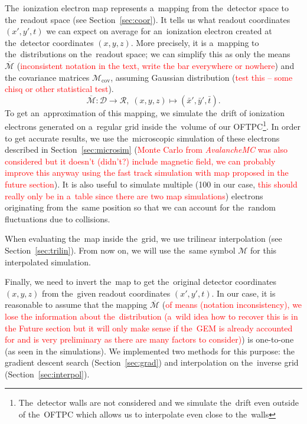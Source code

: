 		The~ionization electron map represents a~mapping from the~detector space to the~readout space (see Section~\ref{sec:coor}). It tells us what readout coordinates $(x',y',t)$ we can expect on average for an~ionization electron created at the~detector coordinates $(x,y,z)$. More precisely, it is a~mapping to the~distributions on the~readout space; we can simplify this as only the means $\overbar{\mathcal{M}}$ (\textcolor{red}{inconsistent notation in the text, write the bar everywhere or nowhere}) and the covariance matrices $\mathcal{M}_\text{cov}$, assuming Gaussian distribution (\textcolor{red}{test this -- some chisq or other statistical test}).
			\begin{equation}
				\overbar{\mathcal{M}}: \mathcal{D} \longrightarrow \mathcal{R},\; (x,y,z) \longmapsto (\bar{x}',\bar{y}',\bar{t}).
			\end{equation}
		To get an~approximation of this mapping, we simulate the~drift of ionization electrons generated on a~regular grid inside the~volume of our \ac{OFTPC}\footnote{The~detector walls are not considered and we simulate the~drift even outside of the~\ac{OFTPC} which allows us to interpolate even close to the~walls}. In order to get accurate results, we use the~microscopic simulation of these electrons described in Section~\ref{sec:microsim} (\textcolor{red}{Monte Carlo from \textit{AvalancheMC} was also considered but it doesn't (didn't?) include magnetic field, we can probably improve this anyway using the fast track simulation with map proposed in the future section}). It is also useful to simulate multiple (100 in our case, \textcolor{red}{this should really only be in a~table since there are two map simulations}) electrons originating from the~same position so that we can account for the~random fluctuations due to collisions.
		
		When evaluating the~map inside the~grid, we use trilinear interpolation (see Section~\ref{sec:trilin}). From now on, we will use the~same symbol $\mathcal{M}$ for this interpolated simulation.
		
		Finally, we need to invert the~map to get the~original detector coordinates $(x,y,z)$ from the~given readout coordinates $(x',y',t)$. In our case, it is reasonable to assume that the mapping $\overbar{\mathcal{M}}$ (\textcolor{red}{of means (notation inconsistency), we lose the information about the~distribution (a~wild idea how to recover this is in the Future section but it will only make sense if the~GEM is already accounted for and is very preliminary as there are many factors to consider)}) is one-to-one (as seen in the simulations). We implemented two methods for this purpose: the gradient descent search (Section~\ref{sec:grad}) and interpolation on the~inverse grid (Section~\ref{sec:interpol}).
		
